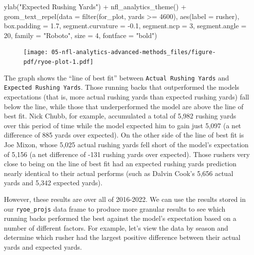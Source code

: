 \documentclass[
  letterpaper,
]{krantz}
\newenvironment{Shaded}{\begin{snugshade}}{\end{snugshade}}
\newcommand{\AttributeTok}[1]{\textcolor[rgb]{0.40,0.45,0.13}{#1}}
\newcommand{\DecValTok}[1]{\textcolor[rgb]{0.68,0.00,0.00}{#1}}
\newcommand{\FloatTok}[1]{\textcolor[rgb]{0.68,0.00,0.00}{#1}}
\newcommand{\FunctionTok}[1]{\textcolor[rgb]{0.28,0.35,0.67}{#1}}
\newcommand{\NormalTok}[1]{\textcolor[rgb]{0.00,0.23,0.31}{#1}}
\newcommand{\SpecialCharTok}[1]{\textcolor[rgb]{0.37,0.37,0.37}{#1}}
\newcommand{\StringTok}[1]{\textcolor[rgb]{0.13,0.47,0.30}{#1}}
\begin{document}
\begin{Shaded}
\begin{Highlighting}[]
  \FunctionTok{ylab}\NormalTok{(}\StringTok{"Expected Rushing Yards"}\NormalTok{) }\SpecialCharTok{+}
  \FunctionTok{nfl\_analytics\_theme}\NormalTok{() }\SpecialCharTok{+}
  \FunctionTok{geom\_text\_repel}\NormalTok{(}\AttributeTok{data =} \FunctionTok{filter}\NormalTok{(for\_plot, yards }\SpecialCharTok{\textgreater{}=} \DecValTok{4600}\NormalTok{),}
                  \FunctionTok{aes}\NormalTok{(}\AttributeTok{label =}\NormalTok{ rusher),}
                  \AttributeTok{box.padding =} \FloatTok{1.7}\NormalTok{,}
                  \AttributeTok{segment.curvature =} \SpecialCharTok{{-}}\FloatTok{0.1}\NormalTok{,}
                  \AttributeTok{segment.ncp =} \DecValTok{3}\NormalTok{, }\AttributeTok{segment.angle =} \DecValTok{20}\NormalTok{,}
                  \AttributeTok{family =} \StringTok{"Roboto"}\NormalTok{, }\AttributeTok{size =} \DecValTok{4}\NormalTok{, }\AttributeTok{fontface =} \StringTok{"bold"}\NormalTok{)}
\end{Highlighting}
\end{Shaded}

\begin{figure}[H]

{\centering \texttt{[image: 05-nfl-analytics-advanced-methods\_files/figure-pdf/ryoe-plot-1.pdf]}

}

\end{figure}

The graph shows the ``line of best fit'' between
\texttt{Actual\ Rushing\ Yards} and \texttt{Expected\ Rushing\ Yards}.
Those running backs that outperformed the models expectations (that is,
more actual rushing yards than expected rushing yards) fall below the
line, while those that underperformed the model are above the line of
best fit. Nick Chubb, for example, accumulated a total of 5,982 rushing
yards over this period of time while the model expected him to gain just
5,097 (a net difference of 885 yards over expected). On the other side
of the line of best fit is Joe Mixon, whose 5,025 actual rushing yards
fell short of the model's expectation of 5,156 (a net difference of -131
rushing yards over expected). Those rushers very close to being on the
line of best fit had an expected rushing yards prediction nearly
identical to their actual performs (such as Dalvin Cook's 5,656 actual
yards and 5,342 expected yards).

However, these results are over all of 2016-2022. We can use the results
stored in our \texttt{ryoe\_projs} data frame to produce more granular
results to see which running backs performed the best against the
model's expectation based on a number of different factors. For example,
let's view the data by season and determine which rusher had the largest
positive difference between their actual yards and expected yards.
\end{document}
